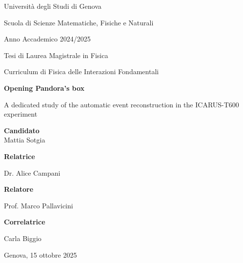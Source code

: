 \begin{titlepage}
    \ifdraft\BgThispage\fi
    \begin{center}
        
        {{Università degli Studi di Genova}}\par

        {Scuola di Scienze Matematiche, Fisiche e Naturali} \par

        \vspace{0.5cm}

        {Anno Accademico 2024/2025}

        \vfill

        Tesi di Laurea Magistrale in Fisica\par
        Curriculum di Fisica delle Interazioni Fondamentali

        \vfill

        \begin{minipage}{0.775\linewidth}
            \centering
            \huge
            \bfseries
            {\LARGE Opening Pandora's box}\par%
            {\Large A dedicated study of the automatic event reconstruction in the ICARUS-T600 experiment}%
        \end{minipage}

        \vfill

        \textbf{\small Candidato}\\{Mattia Sotgia}%
%
        \vfill%

        \begin{minipage}{0.45\linewidth}%
            \textbf{\small Relatrice}\par%
            {Dr. Alice Campani}\par\vspace{1em}%
            \textbf{\small Relatore}\par%
            {Prof. Marco Pallavicini}%
        \end{minipage}%
        \hfill%
        \begin{minipage}{0.45\linewidth}
            \raggedleft
            \textbf{\small Correlatrice}\par
            {Carla Biggio}
        \end{minipage}

        \vspace{2cm}

		Genova, 15 ottobre 2025
    \end{center}
\end{titlepage}

